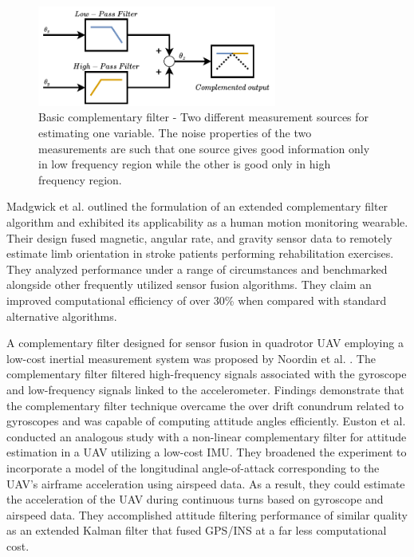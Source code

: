 \begin{figure}[!h]
   \centering
   \includegraphics[width=0.7\textwidth]{figures/complementary.pdf}
   \caption{Basic complementary filter \cite{higgins1975comparison} - Two different measurement sources for estimating one variable. The noise properties of the two measurements are such that one source gives good information only in low frequency region while the other is good only in high frequency region. }
   \label{fig:complementary}
\end{figure}

Madgwick et al. \cite{madgwick2020extended} outlined the formulation of an extended complementary filter algorithm and exhibited its applicability as a human motion monitoring wearable. Their design fused magnetic, angular rate, and gravity sensor data to remotely estimate limb orientation in stroke patients performing rehabilitation exercises. They analyzed performance under a range of circumstances and benchmarked alongside other frequently utilized sensor fusion algorithms. They claim an improved computational efficiency of over 30\% when compared with standard alternative algorithms.

A complementary filter designed for sensor fusion in quadrotor UAV employing a low-cost inertial measurement system was proposed by Noordin et al. \cite{noordin2018sensor}. The complementary filter filtered high-frequency signals associated with the gyroscope and low-frequency signals linked to the accelerometer. Findings demonstrate that the complementary filter technique overcame the over drift conundrum related to gyroscopes and was capable of computing attitude angles efficiently.
Euston et al. \cite{euston2008complementary} conducted an analogous study with a non-linear complementary filter for attitude estimation in a UAV utilizing a low-cost IMU. They broadened the experiment to incorporate a model of the longitudinal angle-of-attack corresponding to the UAV’s airframe acceleration using airspeed data. As a result, they could estimate the acceleration of the UAV during continuous turns based on gyroscope and airspeed data. They accomplished attitude filtering performance of similar quality as an extended Kalman filter that fused GPS/INS at a far less computational cost.

